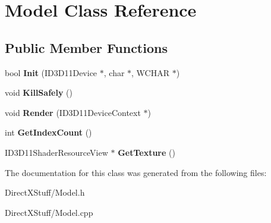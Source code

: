 \hypertarget{class_model}{\section{Model Class Reference}
\label{class_model}
}
\subsection*{Public Member Functions}
\begin{DoxyCompactItemize}
\item 
\hypertarget{class_model_a7b9c5ccc0d4c4f5953eb7c19cc368fbd}{bool {\bfseries Init} (I\-D3\-D11\-Device $\ast$, char $\ast$, W\-C\-H\-A\-R $\ast$)}\label{class_model_a7b9c5ccc0d4c4f5953eb7c19cc368fbd}

\item 
\hypertarget{class_model_a4f662d7b67e2aad8244e9311cd87171f}{void {\bfseries Kill\-Safely} ()}\label{class_model_a4f662d7b67e2aad8244e9311cd87171f}

\item 
\hypertarget{class_model_a0cf55fb5edeb9674309c4ddeaa0d81e8}{void {\bfseries Render} (I\-D3\-D11\-Device\-Context $\ast$)}\label{class_model_a0cf55fb5edeb9674309c4ddeaa0d81e8}

\item 
\hypertarget{class_model_ac9793c2bb238d5447369e2bcfcba790c}{int {\bfseries Get\-Index\-Count} ()}\label{class_model_ac9793c2bb238d5447369e2bcfcba790c}

\item 
\hypertarget{class_model_a6c19a5f5ff5916e32a1734e988895c4b}{I\-D3\-D11\-Shader\-Resource\-View $\ast$ {\bfseries Get\-Texture} ()}\label{class_model_a6c19a5f5ff5916e32a1734e988895c4b}

\end{DoxyCompactItemize}


The documentation for this class was generated from the following files\-:\begin{DoxyCompactItemize}
\item 
Direct\-X\-Stuff/Model.\-h\item 
Direct\-X\-Stuff/Model.\-cpp\end{DoxyCompactItemize}
